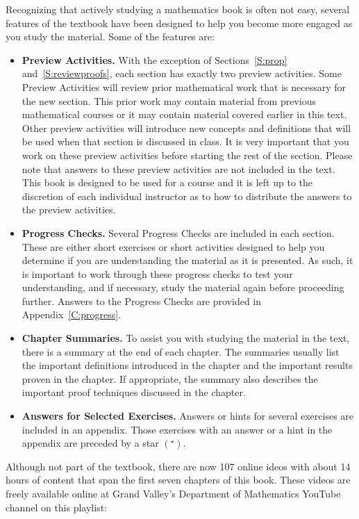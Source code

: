 Recognizing that actively studying a mathematics book is often not easy, several features of the textbook have been designed to help you become more engaged as you study the material.  Some of the features are:
\begin{itemize}
  \item \textbf{Preview Activities.}  With the exception of Sections~\ref{S:prop} and~\ref{S:reviewproofs}, each section has exactly two preview activities.  Some Preview Activities will review prior mathematical work that is necessary for the new section.  This prior work may contain material from previous mathematical courses or it may contain material covered earlier in this text.  Other preview activities will introduce new concepts and definitions that will be used when that section is discussed in class.   It is very important that you work on these preview activities before starting the rest of the section.   Please note that answers to these preview activities are not included in the text.  This book is designed to be used for a course and it is left up to the discretion of each individual instructor as to how to distribute the answers to the preview activities.

\item \textbf{Progress Checks.}  Several Progress Checks are included in each section.  These are either short exercises or short activities designed to help you determine if you are understanding the material as it is presented.  As such, it is important to work through these progress checks to test your understanding, and if necessary, study the material again before proceeding further.  Answers to the Progress Checks are provided in Appendix~\ref{C:progress}.

\item \textbf{Chapter Summaries.}  To assist you with studying the material in the text, there is a summary at the end of each chapter.  The summaries usually list the important definitions introduced in the chapter and the important results proven in the chapter.  If appropriate, the summary also describes the important proof techniques discussed in the chapter.

\item \textbf{Answers for Selected Exercises.}  Answers or hints for several exercises are included in an appendix.    Those exercises with an answer or a hint in the appendix are preceded by a star 
$\left( ^\star \right)$.
\end{itemize}

Although not part of the textbook, there are now 107 online ideos with about 14 hours of content that span the first seven chapters of this book. These videos are freely available online at Grand Valley's Department of Mathematics YouTube channel on this playlist: 
 
